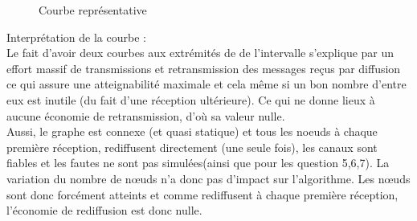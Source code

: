 \documentclass[10pt]{report}
\begin{document}
\begin{figure}[H]
\begin{minipage}{0.5\textwidth}
\begin{flushright}
\vspace{-7cm}
\centering
{}
	\caption[courbe1]{Courbe représentative}	
\end{flushright}\end{minipage}
\end{figure}

Interprétation de la courbe :\\

Le fait d'avoir deux courbes aux extrémités de de l'intervalle s'explique par un effort massif de transmissions et retransmission des messages reçus par diffusion ce qui assure une atteignabilité maximale et cela même si un bon nombre d'entre eux est inutile (du fait d'une réception ultérieure). Ce qui ne donne lieux à aucune économie de retransmission, d'où sa valeur nulle.\\
Aussi, le graphe est connexe (et quasi statique) et tous les noeuds à chaque première réception, rediffusent directement (une seule fois), les canaux sont fiables et les fautes ne sont pas simulées(ainsi que pour les question 5,6,7). La variation du nombre de nœuds n’a donc pas d’impact sur l’algorithme. Les nœuds sont donc forcément atteints et comme rediffusent à chaque première réception, l’économie de rediffusion est donc nulle.

\newpage
\end{document}
